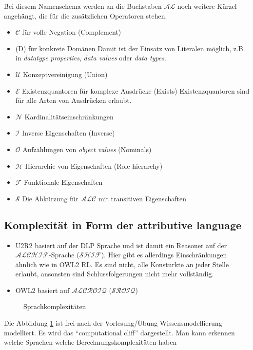 Bei diesem Namenschema werden an die Buchstaben $\mathcal{AL}$ noch weitere Kürzel angehängt, die für die zusätzlichen Operatoren stehen.
\begin{itemize}
  \item $\mathcal{C}$ für volle Negation (Complement)
  \item (D) für konkrete Domänen\newline
Damit ist der Einsatz von Literalen möglich, z.B. in \emph{datatype properties}, \emph{data values} oder \emph{data types}.
  \item $\mathcal{U}$ Konzeptvereinigung (Union)
  \item $\mathcal{E}$ Existenzquantoren für komplexe Ausdrücke (Exists)\newline
Existenzquantoren sind für alle Arten von Ausdrücken erlaubt.
  \item $\mathcal{N}$ Kardinalitätseinschränkungen
  \item $\mathcal{I}$ Inverse Eigenschaften (Inverse)
  \item $\mathcal{O}$ Aufzählungen von \emph{object values} (Nominals)
  \item $\mathcal{H}$ Hierarchie von Eigenschaften (Role hierarchy)
  \item $\mathcal{F}$ Funktionale Eigenschaften
  \item $\mathcal{S}$ Die Abkürzung für $\mathcal{ALC}$ mit transitiven Eigenschaften
\end{itemize}
\cite{wiki:DescriptionLogic}

\subsection{Komplexität in Form der attributive language}
\begin{itemize}
  \item U2R2 basiert auf der DLP Sprache und ist damit ein Reasoner auf der $\mathcal{ALCHIF}$-Sprache ($\mathcal{SHIF}$). Hier gibt es allerdings Einschränkungen ähnlich wie in OWL2 RL. Es sind nicht, alle Konsturkte an jeder Stelle erlaubt, ansonsten sind Schlussfolgerungen nicht mehr vollständig.
  \item OWL2 basiert auf $\mathcal{ALCROIQ}$ ($\mathcal{SROIQ}$) \cite{Krötzsch2008}
\end{itemize}


\begin{figure}[htb]
	\caption{Sprachkomplexitäten}
	\label{image-sprachkomplexitaeten}
	\begin{center}
	\end{center}
\end{figure}
Die Abbildung \ref{image-sprachkomplexitaeten} ist frei nach der Vorlesung/Übung Wissensmodellierung \cite{vonHenke2009} modelliert. Es wird das ``computational cliff'' dargestellt. Man kann erkennen welche Sprachen welche Berechnungskomplexitäten haben

